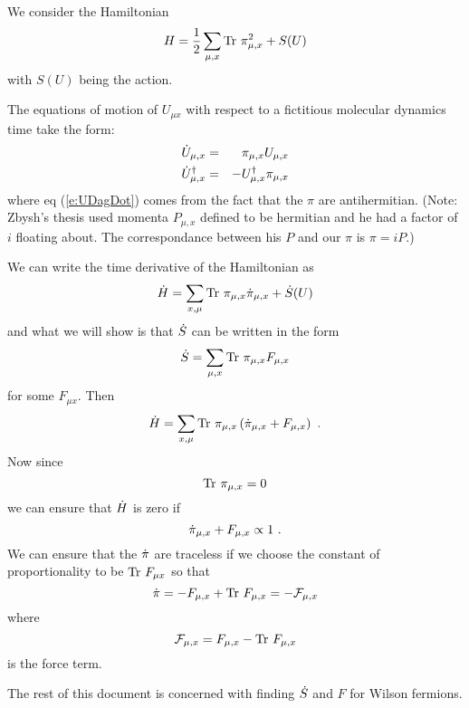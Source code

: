 \documentclass[12pt]{article}
\begin{document}
We consider the Hamiltonian
\begin{equation}
H = \frac{1}{2}\sum_{\mu,x} \mbox{Tr}\  \pi_{\mu,x}^2 + S(U)
\end{equation}
with  $S(U)$ being the action.

The equations of motion of $U_{\mu x}$ with respect to a fictitious 
molecular dynamics time take the form:
\begin{eqnarray}
  \dot{U}_{\mu,x} &=& \pi_{\mu,x} U_{\mu,x}  \label{e:Udot} \\
  \dot{U}^{\dagger}_{\mu,x} &=& - U^{\dagger}_{\mu,x} \pi_{\mu,x} \label{e:UDagDot} \\
\end{eqnarray}
where eq (\ref{e:UDagDot}) comes from the fact that the $\pi$ are 
antihermitian. (Note: Zbysh's thesis used momenta $P_{\mu,x}$ defined
to be hermitian and he had a factor of $i$ floating about. The 
correspondance between his $P$ and our $\pi$ is $\pi=iP$.)

We can write the time derivative of the Hamiltonian as
\begin{equation}
\dot{H} = \sum_{x,\mu} \mbox{Tr}\  \pi_{\mu,x} \dot{\pi}_{\mu,x} + \dot{S}(U)
\end{equation}
and what we will show is that $\dot{S}$ can be written
in the form
\begin{equation}
\dot{S} = \sum_{\mu, x} \mbox{Tr}\  \pi_{\mu,x} F_{\mu,x}
\end{equation}
for some $F_{\mu x}$. Then 
\begin{equation}
\dot{H} = \sum_{x,\mu} \mbox{Tr}\  \pi_{\mu,x} \left( \dot{\pi}_{\mu,x} + F_{\mu,x} \right) \ .
\end{equation}
Now since 
\begin{equation}
\mbox{Tr}\  \pi_{\mu,x} = 0
\end{equation}
we can ensure that $\dot{H}$ is zero if 
\begin{equation}
\dot{\pi}_{\mu,x} + F_{\mu,x} \propto 1 \ .
\end{equation}
We can ensure that the $\dot{\pi}$ are traceless if we choose the
constant of proportionality to be $\mbox{Tr}\  F_{\mu x}$ so that
\begin{equation}
\dot{\pi} = -F_{\mu,x} + \mbox{Tr}\  F_{\mu,x} = - \mathcal{F}_{\mu,x} \label{e:pidot}
\end{equation}
where
\begin{equation}
\mathcal{F}_{\mu,x} = F_{\mu,x} - \mbox{Tr}\  F_{\mu,x} \label{e:mathF}
\end{equation}
is the force term.

The rest of this document is concerned with finding $\dot{S}$ and $F$
for Wilson fermions.
\end{document}
